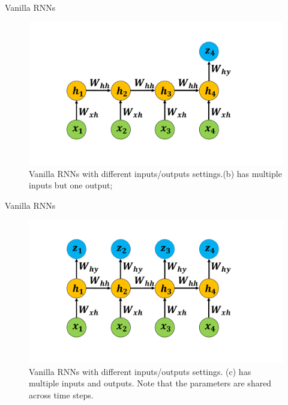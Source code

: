 \documentclass[presentation]{beamer}
\begin{document}
\begin{frame}{Vanilla RNNs}
    \begin{figure}
    \centering
    \includegraphics[width=0.8 \textwidth]{RNN1-2}
    \caption{Vanilla RNNs with different inputs/outputs settings.(b) has multiple inputs but one output; }
    \end{figure}
\end{frame}

\begin{frame}{Vanilla RNNs}
    \begin{figure}
    \centering
    \includegraphics[width=0.8 \textwidth]{RNN1-3}
    \caption{Vanilla RNNs with different inputs/outputs settings. (c) has multiple inputs and outputs. Note that the parameters are shared across time steps.}
    \end{figure}
\end{frame}
\end{document}

